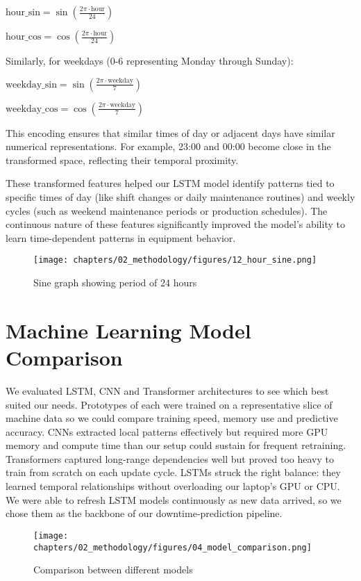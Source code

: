 \(\text{hour\_sin} = \sin\left(\frac{2 \pi \cdot \text{hour}}{24}\right)\)

\(\text{hour\_cos} = \cos\left(\frac{2 \pi \cdot \text{hour}}{24}\right)\)

Similarly, for weekdays (0-6 representing Monday through Sunday):

\(\text{weekday\_sin} = \sin\left(\frac{2 \pi \cdot \text{weekday}}{7}\right)\)

\(\text{weekday\_cos} = \cos\left(\frac{2 \pi \cdot \text{weekday}}{7}\right)\)

This encoding ensures that similar times of day or adjacent days have similar numerical representations. For example, 23:00 and 00:00 become close in the transformed space, reflecting their temporal proximity. 

These transformed features helped our LSTM model identify patterns tied to specific times of day (like shift changes or daily maintenance routines) and weekly cycles (such as weekend maintenance periods or production schedules). The continuous nature of these features significantly improved the model's ability to learn time-dependent patterns in equipment behavior.

\begin{figure}[H]
    \centering
    \texttt{[image: chapters/02\_methodology/figures/12\_hour\_sine.png]}
    \caption{Sine graph showing period of 24 hours}
    \label{fig:sine-graph}
\end{figure}

\section{Machine Learning Model Comparison}
We evaluated LSTM, CNN and Transformer architectures to see which best suited our needs. Prototypes of each were trained on a representative slice of machine data so we could compare training speed, memory use and predictive accuracy. CNNs extracted local patterns effectively but required more GPU memory and compute time than our setup could sustain for frequent retraining. Transformers captured long-range dependencies well but proved too heavy to train from scratch on each update cycle. LSTMs struck the right balance: they learned temporal relationships without overloading our laptop’s GPU or CPU. We were able to refresh LSTM models continuously as new data arrived, so we chose them as the backbone of our downtime‐prediction pipeline.

\begin{figure}[H]
    \centering
    \texttt{[image: chapters/02\_methodology/figures/04\_model\_comparison.png]}
    \caption{Comparison between different models}
\end{figure}

